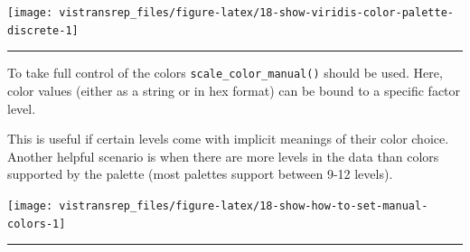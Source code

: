 \documentclass[]{book}
\newenvironment{Shaded}{}{}
\newcommand{\DataTypeTok}[1]{#1}
\newcommand{\KeywordTok}[1]{\textcolor[rgb]{0.00,0.00,1.00}{#1}}
\newcommand{\NormalTok}[1]{#1}
\newcommand{\OperatorTok}[1]{#1}
\newcommand{\StringTok}[1]{\textcolor[rgb]{0.00,0.50,0.50}{#1}}
\begin{document}
\begin{flushright}\texttt{[image: vistransrep\_files/figure-latex/18-show-viridis-color-palette-discrete-1]} \end{flushright}

\begin{center}\rule{0.5\linewidth}{\linethickness}\end{center}

To take full control of the colors \texttt{scale\_color\_manual()} should be used.
Here, color values (either as a string or in hex format) can be bound to a specific factor level.

This is useful if certain levels come with implicit meanings of their color choice.
Another helpful scenario is when there are more levels in the data than colors supported by the palette (most palettes support between 9-12 levels).

\begin{Shaded}
\end{Shaded}

\begin{flushright}\texttt{[image: vistransrep\_files/figure-latex/18-show-how-to-set-manual-colors-1]} \end{flushright}

\begin{center}\rule{0.5\linewidth}{\linethickness}\end{center}
\end{document}
